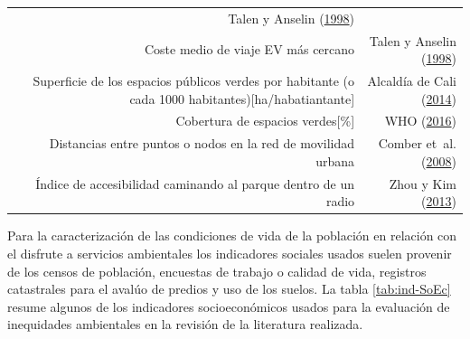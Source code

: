 \documentclass[12pt,a4paper,oneside, openany]{book}
\theoremstyle{definition}
\theoremstyle{definition}
\theoremstyle{definition}
\theoremstyle{remark}
\begin{document}
\begin{longtable}[]{@{}rr@{}}
\begin{minipage}[t]{0.31\columnwidth}
Talen y Anselin
(\protect\hyperlink{ref-talen_assessing_1998}{1998})\strut
\end{minipage}\tabularnewline
\begin{minipage}[t]{0.57\columnwidth}\raggedleft\strut
Coste medio de viaje EV más cercano\strut
\end{minipage} & \begin{minipage}[t]{0.31\columnwidth}\raggedleft\strut
Talen y Anselin
(\protect\hyperlink{ref-talen_assessing_1998}{1998})\strut
\end{minipage}\tabularnewline
\begin{minipage}[t]{0.57\columnwidth}\raggedleft\strut
Superficie de los espacios públicos verdes por habitante (o cada 1000
habitantes){[}ha/habatiantante{]}\strut
\end{minipage} & \begin{minipage}[t]{0.31\columnwidth}\raggedleft\strut
Alcaldía de Cali (\protect\hyperlink{ref-pot2014cali}{2014})\strut
\end{minipage}\tabularnewline
\begin{minipage}[t]{0.57\columnwidth}\raggedleft\strut
Cobertura de espacios verdes{[}\%{]}\strut
\end{minipage} & \begin{minipage}[t]{0.31\columnwidth}\raggedleft\strut
WHO (\protect\hyperlink{ref-who2016urban}{2016})\strut
\end{minipage}\tabularnewline
\begin{minipage}[t]{0.57\columnwidth}\raggedleft\strut
Distancias entre puntos o nodos en la red de movilidad urbana\strut
\end{minipage} & \begin{minipage}[t]{0.31\columnwidth}\raggedleft\strut
Comber et~al. (\protect\hyperlink{ref-comber_using_2008}{2008})\strut
\end{minipage}\tabularnewline
\begin{minipage}[t]{0.57\columnwidth}\raggedleft\strut
Índice de accesibilidad caminando al parque dentro de un radio\strut
\end{minipage} & \begin{minipage}[t]{0.31\columnwidth}\raggedleft\strut
Zhou y Kim (\protect\hyperlink{ref-zhou_social_2013}{2013})\strut
\end{minipage}\tabularnewline
\bottomrule
\end{longtable}

Para la caracterización de las condiciones de vida de la población en
relación con el disfrute a servicios ambientales los indicadores
sociales usados suelen provenir de los censos de población, encuestas de
trabajo o calidad de vida, registros catastrales para el avalúo de
predios y uso de los suelos. La tabla \ref{tab:ind-SoEc} resume algunos
de los indicadores socioeconómicos usados para la evaluación de
inequidades ambientales en la revisión de la literatura realizada.
\end{document}
